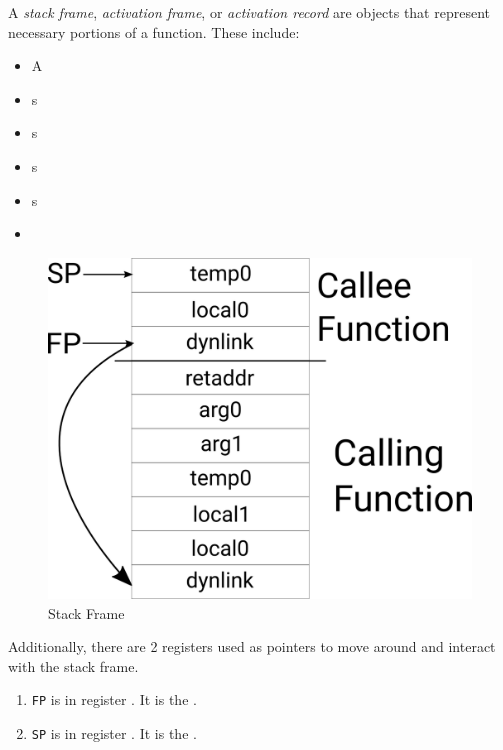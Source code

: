 \begin{definition}\label{def:Stack_Frame}
  A \emph{stack frame}, \emph{activation frame}, or \emph{activation record} are objects that represent necessary portions of a function.
  These include:
  \begin{itemize}[noitemsep]
  \item A 
  \item {}s
  \item {}s
  \item {}s
  \item {}s
  \item {}
  \end{itemize}

  \begin{figure}[h!]
    \centering
    \includegraphics[scale=0.65]{./Drawings/EDAN65-Compilers/Stack_Frame.png}
    \caption{Stack Frame}
    \label{fig:Stack_Frame}
  \end{figure}

  Additionally, there are 2 registers used as pointers to move around and interact with the stack frame.
  \begin{enumerate}[noitemsep]
  \item \texttt{FP} is in register \rbp{}. It is the .
  \item \texttt{SP} is in register \rsp{}. It is the .
  \end{enumerate}
\end{definition}


